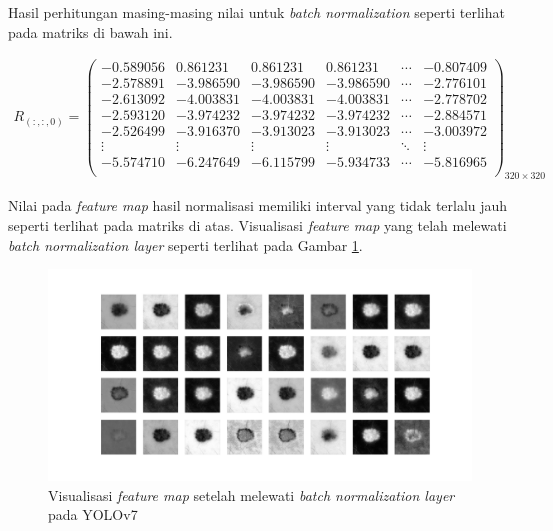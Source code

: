     Hasil perhitungan masing-masing nilai untuk \textit{batch normalization} seperti terlihat pada matriks di bawah ini.

    \begin{align*}
        R_{(:, :, 0)} = 
        \begin{pmatrix}
            -0.589056 & 0.861231  & 0.861231  & 0.861231  & \cdots & -0.807409 \\
            -2.578891 & -3.986590 & -3.986590 & -3.986590 & \cdots & -2.776101 \\
            -2.613092 & -4.003831 & -4.003831 & -4.003831 & \cdots & -2.778702 \\
            -2.593120 & -3.974232 & -3.974232 & -3.974232 & \cdots & -2.884571 \\
            -2.526499 & -3.916370 & -3.913023 & -3.913023 & \cdots & -3.003972 \\
            \vdots    & \vdots    & \vdots    & \vdots    & \ddots & \vdots \\
            -5.574710 & -6.247649 & -6.115799 & -5.934733 & \cdots & -5.816965 \\
        \end{pmatrix}_{320\times 320}
    \end{align*}

    Nilai pada \textit{feature map} hasil normalisasi memiliki interval yang tidak terlalu jauh seperti terlihat pada matriks di atas. Visualisasi \textit{feature map} yang telah melewati \textit{batch normalization layer} seperti terlihat pada Gambar \ref{fig:d-banorm}.

    \begin{figure}[H]
        \begin{center}
            \includegraphics[width=12cm]{img/bab4/bn-layer.png}
            \caption{Visualisasi \textit{feature map} setelah melewati \textit{batch normalization layer} pada YOLOv7}
            \label{fig:d-banorm}
        \end{center}
    \end{figure}

